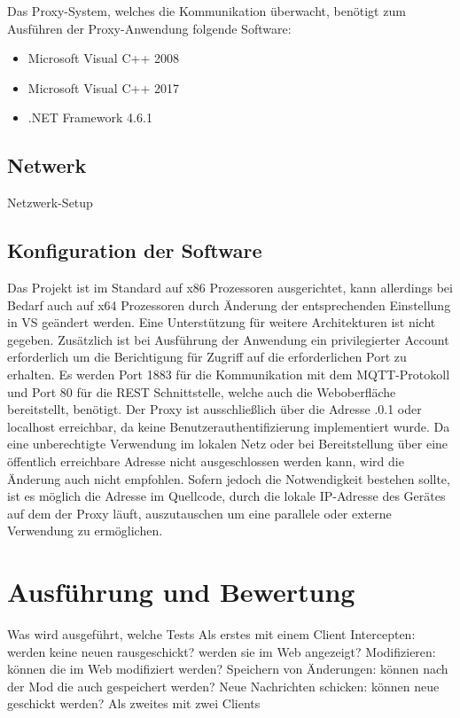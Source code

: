     Das Proxy-System, welches die Kommunikation überwacht, benötigt zum Ausführen der Proxy-Anwendung folgende Software:
    \begin{itemize}
        \item Microsoft Visual C++ 2008
        \item Microsoft Visual C++ 2017
        \item .NET Framework 4.6.1
    \end{itemize}
    
    \subsection{Netwerk}
    Netzwerk-Setup
    
    \subsection{Konfiguration der Software}
    Das Projekt ist im Standard auf x86 Prozessoren ausgerichtet, kann allerdings bei Bedarf auch auf x64 Prozessoren durch Änderung der entsprechenden Einstellung in \ac{VS} geändert werden.
    Eine Unterstützung für weitere Architekturen ist nicht gegeben.
    Zusätzlich ist bei Ausführung der Anwendung ein privilegierter Account erforderlich um die Berichtigung für Zugriff auf die erforderlichen Port zu erhalten.
    Es werden Port 1883 für die Kommunikation mit dem \ac{MQTT}-Protokoll und Port 80 für die \ac{REST} Schnittstelle, welche auch die Weboberfläche bereitstellt, benötigt.
    Der Proxy ist ausschließlich über die Adresse .0.1\grqq{} oder \glqq localhost\grqq{} erreichbar, da keine Benutzerauthentifizierung implementiert wurde. Da eine unberechtigte Verwendung im lokalen Netz oder bei Bereitstellung über eine öffentlich erreichbare Adresse nicht ausgeschlossen werden kann, wird die Änderung auch nicht empfohlen. Sofern jedoch die Notwendigkeit bestehen sollte, ist es möglich die Adresse im Quellcode, durch die lokale IP-Adresse des Gerätes auf dem der Proxy läuft, auszutauschen um eine parallele oder externe Verwendung zu ermöglichen.
    
    
\section{Ausführung und Bewertung}
Was wird ausgeführt, welche Tests
Als erstes mit einem Client
    Intercepten: werden keine neuen rausgeschickt? werden sie im Web angezeigt?
    Modifizieren: können die im Web modifiziert werden?
    Speichern von Änderungen: können nach der Mod die auch gespeichert werden?
    Neue Nachrichten schicken: können neue geschickt werden?
Als zweites mit zwei Clients

